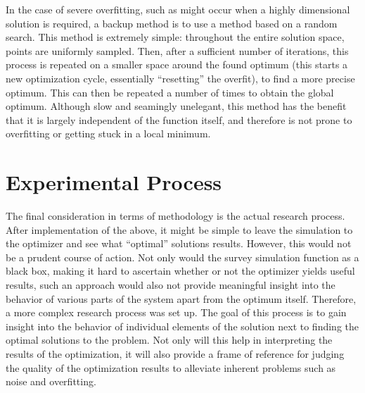 In the case of severe overfitting, such as might occur when a highly dimensional solution is required, a backup method is to use a method based on a random search. This method is extremely simple: throughout the entire solution space, points are uniformly sampled. Then, after a sufficient number of iterations, this process is repeated on a smaller space around the found optimum (this starts a new optimization cycle, essentially ``resetting'' the overfit), to find a more precise optimum. This can then be repeated a number of times to obtain the global optimum. Although slow and seamingly unelegant, this method has the benefit that it is largely independent of the function itself, and therefore is not prone to overfitting or getting stuck in a local minimum.

\section{Experimental Process}
\label{sec:methodologyprocess}
The final consideration in terms of methodology is the actual research process. After implementation of the above, it might be simple to leave the simulation to the optimizer and see what ``optimal'' solutions results. However, this would not be a prudent course of action. Not only would the survey simulation function as a black box, making it hard to ascertain whether or not the optimizer yields useful results, such an approach would also not provide meaningful insight into the behavior of various parts of the system apart from the optimum itself. Therefore, a more complex research process was set up. The goal of this process is to gain insight into the behavior of individual elements of the solution next to finding the optimal solutions to the problem. Not only will this help in interpreting the results of the optimization, it will also provide a frame of reference for judging the quality of the optimization results to alleviate inherent problems such as noise and overfitting.\\

